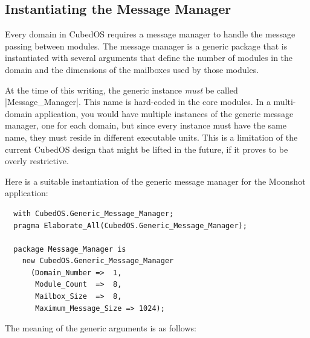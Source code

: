 \subsection{Instantiating the Message Manager}
\label{sec:manual-tutorial-instantiating}

Every domain in CubedOS requires a message manager to handle the message passing between
modules. The message manager is a generic package that is instantiated with several arguments
that define the number of modules in the domain and the dimensions of the mailboxes used by
those modules.

At the time of this writing, the generic instance \emph{must} be called |Message_Manager|. This
name is hard-coded in the core modules. In a multi-domain application, you would have multiple
instances of the generic message manager, one for each domain, but since every instance must
have the same name, they must reside in different executable units. This is a limitation of the
current CubedOS design that might be lifted in the future, if it proves to be overly
restrictive.

Here is a suitable instantiation of the generic message manager for the Moonshot application:

\begin{verbatim}
  with CubedOS.Generic_Message_Manager;
  pragma Elaborate_All(CubedOS.Generic_Message_Manager);

  package Message_Manager is
    new CubedOS.Generic_Message_Manager
      (Domain_Number =>  1,
       Module_Count  =>  8,
       Mailbox_Size  =>  8,
       Maximum_Message_Size => 1024);
\end{verbatim}

The meaning of the generic arguments is as follows:

